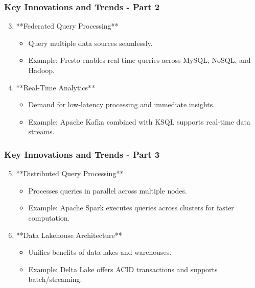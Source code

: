 \documentclass[aspectratio=169]{beamer}
\begin{document}
\begin{frame}[fragile]
    \frametitle{Key Innovations and Trends - Part 2}
    \begin{enumerate}
        \setcounter{enumi}{2}
        \item **Federated Query Processing**
        \begin{itemize}
            \item Query multiple data sources seamlessly.
            \item Example: Presto enables real-time queries across MySQL, NoSQL, and Hadoop.
        \end{itemize}

        \item **Real-Time Analytics**
        \begin{itemize}
            \item Demand for low-latency processing and immediate insights.
            \item Example: Apache Kafka combined with KSQL supports real-time data streams.
        \end{itemize}
    \end{enumerate}
\end{frame}

\begin{frame}[fragile]
    \frametitle{Key Innovations and Trends - Part 3}
    \begin{enumerate}
        \setcounter{enumi}{4}
        \item **Distributed Query Processing**
        \begin{itemize}
            \item Processes queries in parallel across multiple nodes.
            \item Example: Apache Spark executes queries across clusters for faster computation.
        \end{itemize}

        \item **Data Lakehouse Architecture**
        \begin{itemize}
            \item Unifies benefits of data lakes and warehouses.
            \item Example: Delta Lake offers ACID transactions and supports batch/streaming.
        \end{itemize}
    \end{enumerate}
\end{frame}
\end{document}
